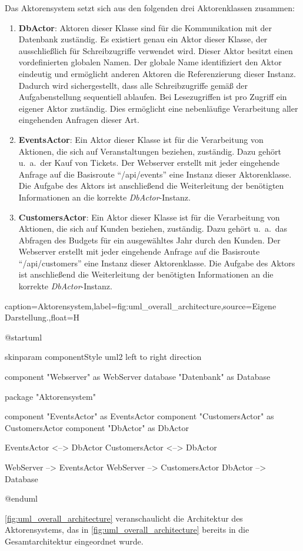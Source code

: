 Das Aktorensystem setzt sich aus den folgenden drei Aktorenklassen zusammen:
\begin{enumerate}
    \item \textbf{DbActor}: Aktoren dieser Klasse sind für die Kommunikation mit der Datenbank zuständig.
    Es existiert genau ein Aktor dieser Klasse, der ausschließlich für Schreibzugriffe verwendet wird.
    Dieser Aktor besitzt einen vordefinierten globalen Namen.
    Der globale Name identifiziert den Aktor eindeutig und ermöglicht anderen Aktoren die Referenzierung dieser Instanz.
    Dadurch wird sichergestellt, dass alle Schreibzugriffe gemäß der Aufgabenstellung sequentiell ablaufen.
    Bei Lesezugriffen ist pro Zugriff ein eigener Aktor zuständig.
    Dies ermöglicht eine nebenläufige Verarbeitung aller eingehenden Anfragen dieser Art.
    \item \textbf{EventsActor}: Ein Aktor dieser Klasse ist für die Verarbeitung von Aktionen, die sich auf Veranstaltungen beziehen, zuständig.
    Dazu gehört u.\ a.\ der Kauf von Tickets.
    Der Webserver erstellt mit jeder eingehende Anfrage auf die Basisroute \enquote{/api/events} eine Instanz dieser Aktorenklasse. 
    Die Aufgabe des Aktors ist anschließend die Weiterleitung der benötigten Informationen an die korrekte \textit{DbActor}-Instanz.
    \item \textbf{CustomersActor}: Ein Aktor dieser Klasse ist für die Verarbeitung von Aktionen, die sich auf Kunden beziehen, zuständig.
    Dazu gehört u.\ a.\ das Abfragen des Budgets für ein ausgewähltes Jahr durch den Kunden.
    Der Webserver erstellt mit jeder eingehende Anfrage auf die Basisroute \enquote{/api/customers} eine Instanz dieser Aktorenklasse. 
    Die Aufgabe des Aktors ist anschließend die Weiterleitung der benötigten Informationen an die korrekte \textit{DbActor}-Instanz.
\end{enumerate}

\begin{dhbwfigure}{caption=Aktorensystem,label=fig:uml_overall_architecture,source={Eigene Darstellung.},float=H}
    \begin{plantuml}
        @startuml

            skinparam componentStyle uml2
            left to right direction

            component "Webserver" as WebServer
            database "Datenbank" as Database

            package "Aktorensystem" {
                component "EventsActor" as EventsActor
                component "CustomersActor" as CustomersActor
                component "DbActor" as DbActor

                EventsActor <--> DbActor
                CustomersActor <--> DbActor
            }

            WebServer --> EventsActor
            WebServer --> CustomersActor
            DbActor --> Database

        @enduml
    \end{plantuml}
\end{dhbwfigure}\unskip

\autoref{fig:uml_overall_architecture} veranschaulicht die Architektur des Aktorensystems, das in \autoref{fig:uml_overall_architecture} bereits in die Gesamtarchitektur eingeordnet wurde.
